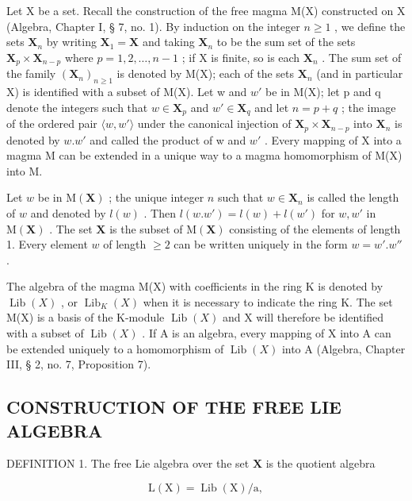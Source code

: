 Let X be a set. Recall the construction of the free magma M(X) constructed on X (Algebra, Chapter I, § 7, no. 1). By induction on the integer \(n \geqslant 1\) , we define the sets \(\mathbf{X}_n\) by writing \(\mathbf{X}_1 = \mathbf{X}\) and taking \(\mathbf{X}_n\) to be the sum set of the sets \(\mathbf{X}_p \times \mathbf{X}_{n-p}\) where \(p = 1, 2, \ldots, n-1\) ; if X is finite, so is each \(\mathbf{X}_n\) . The sum set of the family \((\mathbf{X}_n)_{n \geqslant 1}\) is denoted by M(X); each of the sets \(\mathbf{X}_n\) (and in particular X) is identified with a subset of M(X). Let w and \(w'\) be in M(X); let p and q denote the integers such that \(w \in \mathbf{X}_p\) and \(w' \in \mathbf{X}_q\) and let \(n = p + q\) ; the image of the ordered pair \(\langle w, w' \rangle\) under the canonical injection of \(\mathbf{X}_p \times \mathbf{X}_{n-p}\) into \(\mathbf{X}_n\) is denoted by \(w.w'\) and called the product of w and \(w'\) . Every mapping of X into a magma M can be extended in a unique way to a magma homomorphism of M(X) into M.

Let \(w\) be in \(\mathrm{M}(\mathbf{X})\) ; the unique integer \(n\) such that \(w \in \mathbf{X}_n\) is called the length of \(w\) and denoted by \(l(w)\) . Then \(l(w.w') = l(w) + l(w')\) for \(w, w'\) in \(\mathrm{M}(\mathbf{X})\) . The set \(\mathbf{X}\) is the subset of \(\mathrm{M}(\mathbf{X})\) consisting of the elements of length 1. Every element \(w\) of length \(\geqslant 2\) can be written uniquely in the form \(w = w'.w''\) .

The algebra of the magma M(X) with coefficients in the ring K is denoted by \(\operatorname{Lib}(X)\) , or \(\operatorname{Lib}_{K}(X)\) when it is necessary to indicate the ring K. The set M(X) is a basis of the K-module \(\operatorname{Lib}(X)\) and X will therefore be identified with a subset of \(\operatorname{Lib}(X)\) . If A is an algebra, every mapping of X into A can be extended uniquely to a homomorphism of \(\operatorname{Lib}(X)\) into A (Algebra, Chapter III, § 2, no. 7, Proposition 7).

\subsection{CONSTRUCTION OF THE FREE LIE ALGEBRA}

DEFINITION 1. The free Lie algebra over the set \(\mathbf{X}\) is the quotient algebra

\[
\mathrm{L} (\mathrm{X}) = \operatorname{Lib} (\mathrm{X}) / \mathrm{a},
\]

